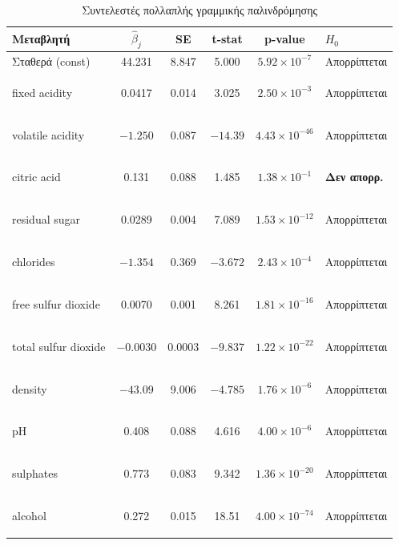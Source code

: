 \documentclass[12pt,a4paper]{article}
\begin{document}
\begin{table}[H]
\centering
\caption{Συντελεστές πολλαπλής γραμμικής παλινδρόμησης}
\label{tab:multiple_regression}
\small
\begin{tabular}{lccccl}
\toprule
\textbf{Μεταβλητή} & $\hat{\beta}_j$ & \textbf{SE} & \textbf{t-stat} & \textbf{p-value} & $H_0$ \\
\midrule
Σταθερά (const) & 44.231 & 8.847 & 5.000 & $5.92 \times 10^{-7}$ & Απορρίπτεται \\
\begin{english}fixed acidity\end{english} & 0.0417 & 0.014 & 3.025 & $2.50 \times 10^{-3}$ & Απορρίπτεται \\
\begin{english}volatile acidity\end{english} & $-1.250$ & 0.087 & $-14.39$ & $4.43 \times 10^{-46}$ & Απορρίπτεται \\
\begin{english}citric acid\end{english} & 0.131 & 0.088 & 1.485 & $1.38 \times 10^{-1}$ & \textbf{Δεν απορρ.} \\
\begin{english}residual sugar\end{english} & 0.0289 & 0.004 & 7.089 & $1.53 \times 10^{-12}$ & Απορρίπτεται \\
\begin{english}chlorides\end{english} & $-1.354$ & 0.369 & $-3.672$ & $2.43 \times 10^{-4}$ & Απορρίπτεται \\
\begin{english}free sulfur dioxide\end{english} & 0.0070 & 0.001 & 8.261 & $1.81 \times 10^{-16}$ & Απορρίπτεται \\
\begin{english}total sulfur dioxide\end{english} & $-0.0030$ & 0.0003 & $-9.837$ & $1.22 \times 10^{-22}$ & Απορρίπτεται \\
\begin{english}density\end{english} & $-43.09$ & 9.006 & $-4.785$ & $1.76 \times 10^{-6}$ & Απορρίπτεται \\
\begin{english}pH\end{english} & 0.408 & 0.088 & 4.616 & $4.00 \times 10^{-6}$ & Απορρίπτεται \\
\begin{english}sulphates\end{english} & 0.773 & 0.083 & 9.342 & $1.36 \times 10^{-20}$ & Απορρίπτεται \\
\begin{english}alcohol\end{english} & 0.272 & 0.015 & 18.51 & $4.00 \times 10^{-74}$ & Απορρίπτεται \\
\bottomrule
\end{tabular}
\end{table}
\end{document}
